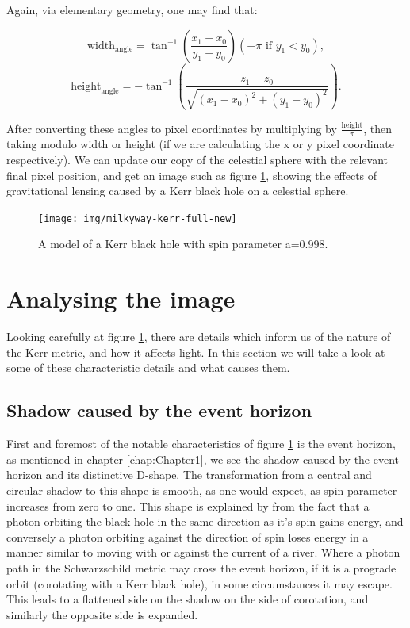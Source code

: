 \documentclass[oneside,openright,frontopenright, singlespacing]{dmathesis}
\begin{document}
\vspace{1em}
	Again, via elementary geometry, one may find that:

	\[\mbox{width}_{\mbox{angle}} = \tan^{-1}\left(\frac{x_1-x_0}{y_1-y_0}\right) (+\pi \mbox{ if } y_1<y_0),\]
	\[\mbox{height}_{\mbox{angle}} = -\tan^{-1}\left(\frac{z_1-z_0}{\sqrt{(x_1-x_0)^2+(y_1-y_0)^2}}\right).\]

\vspace{1em}
	After converting these angles to pixel coordinates by multiplying by $\frac{\mbox{height}}{\pi}$, then taking modulo width or height (if we are calculating the x or y pixel coordinate respectively). We can update our copy of the celestial sphere with the relevant final pixel position, and get an image such as figure \ref{fig:Figure4.3}, showing the effects of gravitational lensing caused by a Kerr black hole on a celestial sphere.

\begin{figure}[!ht]
	\centering
	\texttt{[image: img/milkyway-kerr-full-new]}
	\caption{A model of a Kerr black hole with spin parameter a=0.998.}
	\label{fig:Figure4.3}
\end{figure}

\section{Analysing the image}\label{sec:Section4.8}

	Looking carefully at figure \ref{fig:Figure4.3}, there are details which inform us of the nature of the Kerr metric, and how it affects light. In this section we will take a look at some of these characteristic details and what causes them. 

\subsection{Shadow caused by the event horizon}\label{subsec:Subsection4.8.1}

\vspace{1em}
	First and foremost of the notable characteristics of figure \ref{fig:Figure4.3} is the event horizon, as mentioned in chapter \ref{chap:Chapter1}, we see the shadow caused by the event horizon and its distinctive D-shape. The transformation from a central and circular shadow to this shape is smooth, as one would expect, as spin parameter increases from zero to one. This shape is explained by from the fact that a photon orbiting the black hole in the same direction as it's spin gains energy, and conversely a photon orbiting against the direction of spin loses energy in a manner similar to moving with or against the current of a river. Where a photon path in the Schwarzschild metric may cross the event horizon, if it is a prograde orbit (corotating with a Kerr black hole), in some circumstances it may escape. This leads to a flattened side on the shadow on the side of corotation, and similarly the opposite side is expanded.
\end{document}
